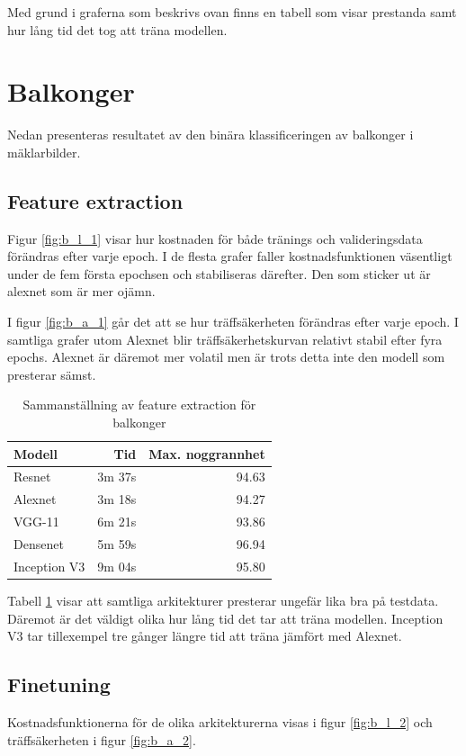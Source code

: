 \documentclass[]{kththesis}
\begin{document}
Med grund i graferna som beskrivs ovan finns en tabell som visar prestanda samt hur lång tid det tog att träna modellen.

\section{Balkonger}
Nedan presenteras resultatet av den binära klassificeringen av balkonger i mäklarbilder.


\subsection{Feature extraction}
Figur \ref{fig:b_l_1} visar hur kostnaden för både tränings och valideringsdata förändras efter varje epoch. 
I de flesta grafer faller kostnadsfunktionen väsentligt under de fem första epochsen och stabiliseras därefter.
Den som sticker ut är alexnet som är mer ojämn.


I figur \ref{fig:b_a_1} går det att se hur träffsäkerheten förändras efter varje epoch.
I samtliga grafer utom Alexnet blir träffsäkerhetskurvan relativt stabil efter fyra epochs.
Alexnet är däremot mer volatil men är trots detta inte den modell som presterar sämst.



\begin{table}[h]
  \centering
  \begin{tabular}{|l|r|r|}
    Modell & Tid & Max. noggrannhet \\ 
    \hline
    Resnet       & 3m 37s & 94.63 \\
    Alexnet      & 3m 18s & 94.27 \\
    VGG-11       & 6m 21s & 93.86 \\
    Densenet     & 5m 59s & 96.94 \\
    Inception V3 & 9m 04s & 95.80 \\
  \end{tabular}
  \caption{Sammanställning av feature extraction för balkonger}
  \label{fig:sam_1}
  
\end{table}

Tabell \ref{fig:sam_1} visar att samtliga arkitekturer presterar ungefär lika bra på testdata.
Däremot är det väldigt olika hur lång tid det tar att träna modellen. 
Inception V3 tar tillexempel tre gånger längre tid att träna jämfört med Alexnet.

\subsection{Finetuning}
Kostnadsfunktionerna för de olika arkitekturerna visas i figur \ref{fig:b_l_2} och träffsäkerheten i figur \ref{fig:b_a_2}. 
\end{document}
